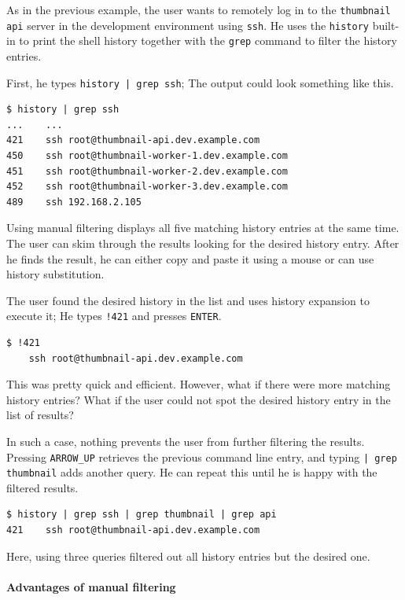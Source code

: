 As in the previous example, the user wants to remotely log in to the \verb|thumbnail| \verb|api| server in the development environment using \verb|ssh|. He uses the \verb|history| built-in to print the shell history together with the \verb|grep| command to filter the history entries.

First, he types \verb#history | grep ssh#; The output could look something like this.

\begin{verbatim}
$ history | grep ssh
...    ...
421    ssh root@thumbnail-api.dev.example.com
450    ssh root@thumbnail-worker-1.dev.example.com
451    ssh root@thumbnail-worker-2.dev.example.com
452    ssh root@thumbnail-worker-3.dev.example.com
489    ssh 192.168.2.105
\end{verbatim}


Using manual filtering displays all five matching history entries at the same time. The user can skim through the results looking for the desired history entry. 
After he finds the result, he can either copy and paste it using a mouse or can use history substitution.

The user found the desired history in the list and uses history expansion to execute it; He types \verb|!421| and presses \verb|ENTER|.

\begin{verbatim}
$ !421
    ssh root@thumbnail-api.dev.example.com
\end{verbatim}

This was pretty quick and efficient. However, what if there were more matching history entries? What if the user could not spot the desired history entry in the list of results?

In such a case, nothing prevents the user from further filtering the results. Pressing \verb|ARROW_UP| retrieves the previous command line entry, and typing \verb#| grep thumbnail# adds another query. He can repeat this until he is happy with the filtered results.

\begin{verbatim}
$ history | grep ssh | grep thumbnail | grep api
421    ssh root@thumbnail-api.dev.example.com
\end{verbatim}

Here, using three queries filtered out all history entries but the desired one.

\paragraph{Advantages of manual filtering}


